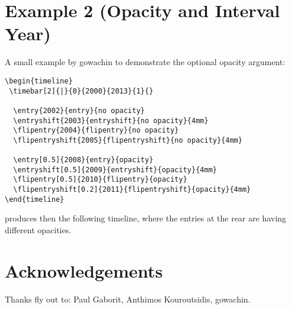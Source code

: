 \documentclass{article}
\begin{document}
\section{Example 2 (Opacity and Interval Year)}
A small example by gowachin to demonstrate the optional opacity argument:

\begin{lstlisting}
\begin{timeline}
 \timebar[2]{|}{0}{2000}{2013}{1}{}

  \entry{2002}{entry}{no opacity}
  \entryshift{2003}{entryshift}{no opacity}{4mm}
  \flipentry{2004}{flipentry}{no opacity}
  \flipentryshift{2005}{flipentryshift}{no opacity}{4mm}

  \entry[0.5]{2008}{entry}{opacity}
  \entryshift[0.5]{2009}{entryshift}{opacity}{4mm}
  \flipentry[0.5]{2010}{flipentry}{opacity}
  \flipentryshift[0.2]{2011}{flipentryshift}{opacity}{4mm}
\end{timeline}

\end{lstlisting}

produces then the following timeline, where the entries at the rear are having different opacities.

\begin{timeline}


\end{timeline}


\section{Acknowledgements}
Thanks fly out to: Paul Gaborit, Anthimos Kouroutsidis, gowachin.
\end{document}
